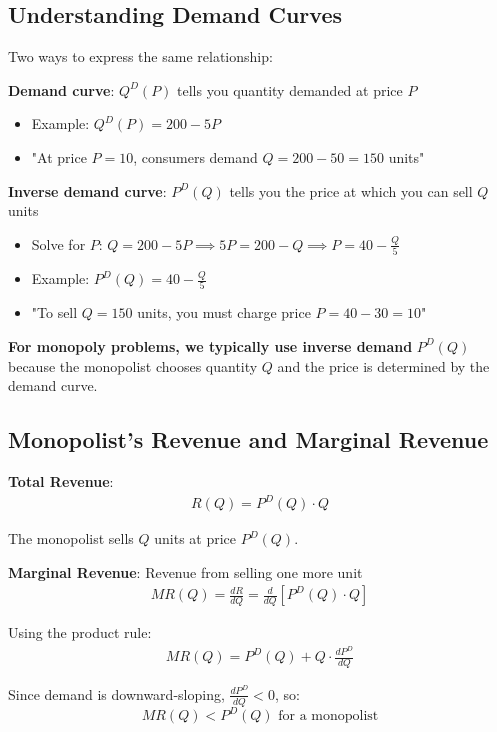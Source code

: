 \documentclass[12pt]{article}
\begin{document}
\newpage

\subsection{Understanding Demand Curves}

\begin{keyidea}
Two ways to express the same relationship:

\textbf{Demand curve}: $Q^D(P)$ tells you quantity demanded at price $P$
\begin{itemize}
\item Example: $Q^D(P) = 200 - 5P$
\item "At price $P = 10$, consumers demand $Q = 200 - 50 = 150$ units"
\end{itemize}

\textbf{Inverse demand curve}: $P^D(Q)$ tells you the price at which you can sell $Q$ units
\begin{itemize}
\item Solve for $P$: $Q = 200 - 5P \implies 5P = 200 - Q \implies P = 40 - \frac{Q}{5}$
\item Example: $P^D(Q) = 40 - \frac{Q}{5}$
\item "To sell $Q = 150$ units, you must charge price $P = 40 - 30 = 10$"
\end{itemize}

\textbf{For monopoly problems, we typically use inverse demand} $P^D(Q)$ because the monopolist chooses quantity $Q$ and the price is determined by the demand curve.
\end{keyidea}

\subsection{Monopolist's Revenue and Marginal Revenue}

\begin{keyidea}
\textbf{Total Revenue}:
\begin{align*}
R(Q) = P^D(Q) \cdot Q
\end{align*}

The monopolist sells $Q$ units at price $P^D(Q)$.

\vspace{0.3cm}

\textbf{Marginal Revenue}: Revenue from selling one more unit
\begin{align*}
MR(Q) = \frac{dR}{dQ} = \frac{d}{dQ}[P^D(Q) \cdot Q]
\end{align*}

Using the product rule:
\begin{align*}
MR(Q) = P^D(Q) + Q \cdot \frac{dP^D}{dQ}
\end{align*}

Since demand is downward-sloping, $\frac{dP^D}{dQ} < 0$, so:
$$\boxed{MR(Q) < P^D(Q) \text{ for a monopolist}}$$
\end{keyidea}
\end{document}

